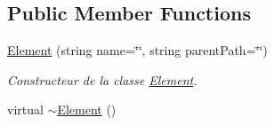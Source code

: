 \subsection*{Public Member Functions}
\begin{DoxyCompactItemize}
\item 
\hyperlink{class_element_a30fb38cc718fb273c63d0c235d7f7e8e}{Element} (string name=\char`\"{}\char`\"{}, string parentPath=\char`\"{}\char`\"{})
\begin{DoxyCompactList}\small\item\em Constructeur de la classe \hyperlink{class_element}{Element}. \item\end{DoxyCompactList}\item 
\hypertarget{class_element_a13d54ba9c08b6bec651402f1c2bb002c}{
virtual \hyperlink{class_element_a13d54ba9c08b6bec651402f1c2bb002c}{$\sim$Element} ()}
\label{class_element_a13d54ba9c08b6bec651402f1c2bb002c}


\end{DoxyCompactItemize}
